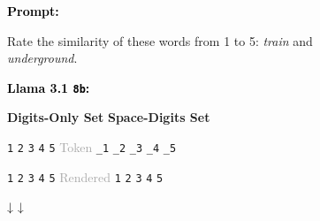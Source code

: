 \begin{figure}[t]
\begin{tcolorbox}[
  width=\linewidth,
  height=2.6in,
  colframe=gray,
  colback=white,
  boxrule=0.5pt,
  arc=2pt,
]
{\sffamily
\vspace{0.1em}
\small
\begin{center}
{\textcolor{black}{\textbf{Prompt:}}

Rate the similarity of these words from 1 to 5: \emph{train} and \emph{underground}.}
\end{center}

\begin{center}

    \vspace{0.7em}
    
    \textcolor{black}{\textbf{Llama 3.1 \texttt{8b}:}}

    \vspace{0.5em}
    
    \textbf{Digits-Only Set} \hfill \textbf{Space-Digits Set}

    \vspace{0.5em}

    \texttt{1} \hspace{0.2em} \texttt{2} \hspace{0.2em} \texttt{3} \hspace{0.2em} \texttt{4} \hspace{0.2em} \texttt{5}
    \hfill
    {\small \textcolor{darkgray}{Token}}
    \hfill 
    \texttt{\_1} \texttt{\_2} \texttt{\_3} \texttt{\_4} \texttt{\_5}

    \vspace{0.5em}

    \texttt{1} \hspace{0.2em} \texttt{2} \hspace{0.2em} \texttt{3} \hspace{0.2em} \texttt{4} \hspace{0.2em} \texttt{5} 
    \hfill
    {\small \textcolor{darkgray}{Rendered}}
    \hfill 
    \texttt{1} \hspace{0.2em} \texttt{2} \hspace{0.2em} \texttt{3} \hspace{0.2em} \texttt{4} \hspace{0.2em} \texttt{5}

    \vspace{0.5em}

    \textcolor{black}{↓} \hspace{14em} \textcolor{black}{↓}


\end{center}}
\end{tcolorbox}
\end{figure}

